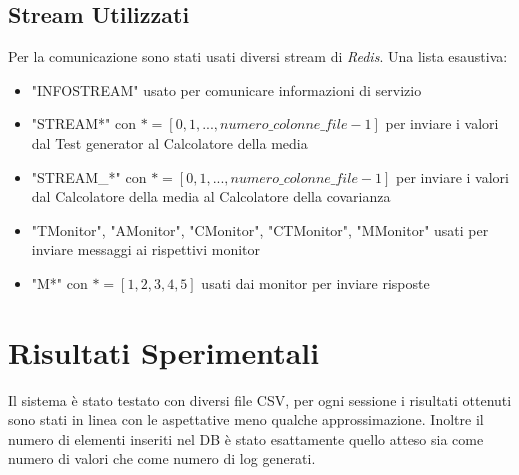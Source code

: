 \documentclass{article}
\begin{document}
\newpage

\subsection{Stream Utilizzati}
Per la comunicazione sono stati usati diversi stream di \textit{Redis}.
\vspace{4pt} \newline
Una lista esaustiva:
\begin{itemize}
	\item "INFOSTREAM" usato per comunicare informazioni di servizio
	\item "STREAM*" con $* = [0,1,...,numero\_colonne\_file - 1]$ per inviare i valori dal
	      Test generator al Calcolatore della media
	\item "STREAM\_*" con $* = [0,1,...,numero\_colonne\_file - 1]$ per inviare i valori dal
	      Calcolatore della media al Calcolatore della covarianza
	\item "TMonitor", "AMonitor", "CMonitor", "CTMonitor", "MMonitor" 
	      usati per inviare messaggi ai rispettivi monitor
	\item "M*" con $* = [1,2,3,4,5]$ usati dai monitor per inviare risposte 
\end{itemize}

\section{Risultati Sperimentali}
Il sistema è stato testato con diversi file CSV, per ogni sessione i risultati ottenuti
sono stati in linea con le aspettative meno qualche approssimazione. Inoltre il numero di elementi
inseriti nel DB è stato esattamente quello atteso sia come numero di valori che come numero 
di log generati.
\end{document}
